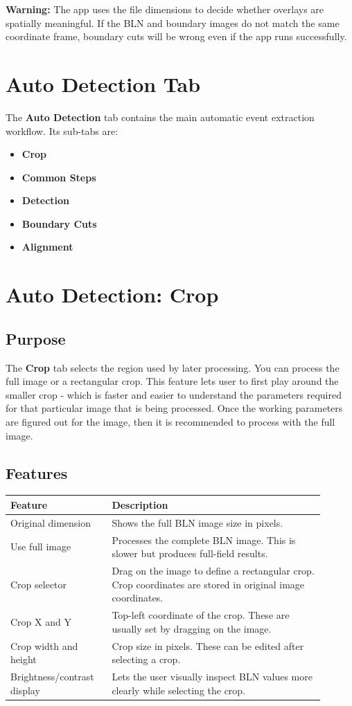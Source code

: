 \documentclass[11pt]{article}
\newcommand{\ui}[1]{\textbf{#1}}
\newcommand{\warn}[1]{\vspace{0.3em}\noindent\textcolor{red!70!black}{\textbf{Warning:}} #1\vspace{0.3em}}
\begin{document}
\warn{The app uses the file dimensions to decide whether overlays are spatially meaningful. If the BLN and boundary images do not match the same coordinate frame, boundary cuts will be wrong even if the app runs successfully.}

\section{Auto Detection Tab}

The \ui{Auto Detection} tab contains the main automatic event extraction workflow. Its sub-tabs are:

\begin{itemize}
    \item \ui{Crop}
    \item \ui{Common Steps}
    \item \ui{Detection}
    \item \ui{Boundary Cuts}
    \item \ui{Alignment}
\end{itemize}

\section{Auto Detection: Crop}

\subsection{Purpose}

The \ui{Crop} tab selects the region used by later processing. You can process the full image or a rectangular crop. This feature lets user to first play around the smaller crop - which is faster and easier to understand the parameters required for that particular image that is being processed. Once the working parameters are figured out for the image, then it is recommended to process with the full image. 

\subsection{Features}

\begin{longtable}{p{0.28\linewidth}p{0.62\linewidth}}
\toprule
\textbf{Feature} & \textbf{Description} \\
\midrule
Original dimension & Shows the full BLN image size in pixels. \\
Use full image & Processes the complete BLN image. This is slower but produces full-field results. \\
Crop selector & Drag on the image to define a rectangular crop. Crop coordinates are stored in original image coordinates. \\
Crop X and Y & Top-left coordinate of the crop. These are usually set by dragging on the image. \\
Crop width and height & Crop size in pixels. These can be edited after selecting a crop. \\
Brightness/contrast display & Lets the user visually inspect BLN values more clearly while selecting the crop. \\
\bottomrule
\end{longtable}
\end{document}
